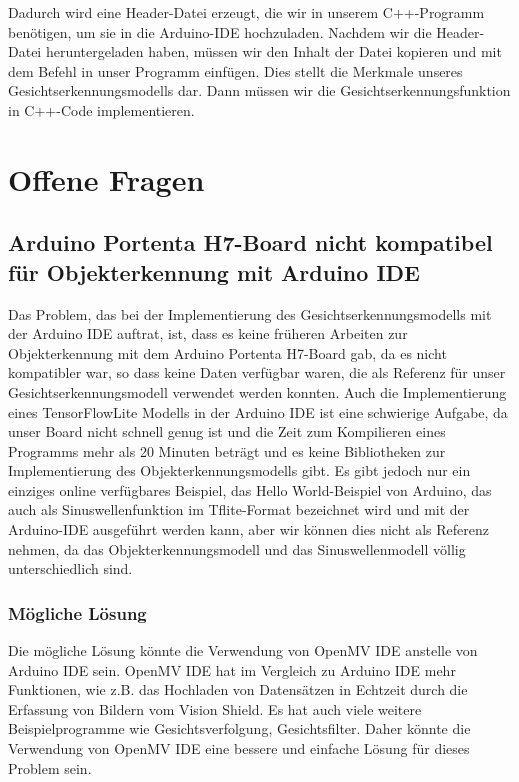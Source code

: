 Dadurch wird eine Header-Datei erzeugt, die wir in unserem C++-Programm benötigen, um sie in die Arduino-IDE hochzuladen. Nachdem wir die Header-Datei heruntergeladen haben, müssen wir den Inhalt der Datei kopieren und mit dem Befehl  in unser Programm einfügen. Dies stellt die Merkmale unseres Gesichtserkennungsmodells dar. Dann müssen wir die Gesichtserkennungsfunktion in C++-Code implementieren.

\section{Offene Fragen}

\subsection{Arduino Portenta H7-Board nicht kompatibel für Objekterkennung mit Arduino IDE}

Das Problem, das bei der Implementierung des Gesichtserkennungsmodells mit der Arduino IDE auftrat, ist, dass es keine früheren Arbeiten zur Objekterkennung mit dem Arduino Portenta H7-Board gab, da es nicht kompatibler war, so dass keine Daten verfügbar waren, die als Referenz für unser Gesichtserkennungsmodell verwendet werden konnten.\cite{GoogleTensorFlowLite:2021} Auch die Implementierung eines TensorFlowLite Modells in der Arduino IDE ist eine schwierige Aufgabe, da unser Board nicht schnell genug ist und die Zeit zum Kompilieren eines Programms mehr als 20 Minuten beträgt und es keine Bibliotheken zur Implementierung des Objekterkennungsmodells gibt. Es gibt jedoch nur ein einziges online verfügbares Beispiel, das Hello World-Beispiel von Arduino, das auch als Sinuswellenfunktion im Tflite-Format bezeichnet wird und mit der Arduino-IDE ausgeführt werden kann, aber wir können dies nicht als Referenz nehmen, da das Objekterkennungsmodell und das Sinuswellenmodell völlig unterschiedlich sind. 

\subsubsection{Mögliche Lösung}

Die mögliche Lösung könnte die Verwendung von OpenMV IDE anstelle von Arduino IDE sein. OpenMV IDE hat im Vergleich zu Arduino IDE mehr Funktionen, wie z.B. das Hochladen von Datensätzen in Echtzeit durch die Erfassung von Bildern vom Vision Shield. Es hat auch viele weitere Beispielprogramme wie Gesichtsverfolgung, Gesichtsfilter. Daher könnte die Verwendung von OpenMV IDE eine bessere und einfache Lösung für dieses Problem sein. 

